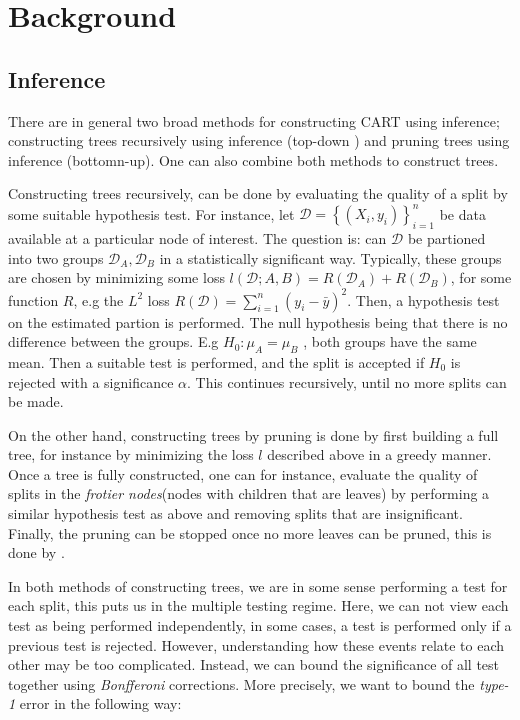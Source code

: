\documentclass{article}
\theoremstyle{definition} \newtheorem{definition}[theorem]{Definition}
\theoremstyle{remark} \newtheorem{remark}[theorem]{Remark}
\begin{document}
\section{Background}

\subsection{Inference}

There are in general two broad methods for constructing CART using
inference; constructing trees recursively using inference (top-down ) and pruning trees
using inference (bottomn-up). One can also combine both methods to construct trees.

Constructing trees recursively, can be done by evaluating the quality of a split
by some suitable hypothesis test. For instance, let $ \mathcal{D} = \left\{
(X_i,y_i) \right\} _{i=1}^{n} $ be data available at a particular node of
interest. The question is: can $ \mathcal{D} $ be partioned into two groups $
\mathcal{D}_A, \mathcal{D}_B $ in a statistically significant way. Typically,
these groups are chosen by minimizing some loss $ l(\mathcal{D}; A, B) =
R(\mathcal{D}_A) + R(\mathcal{D}_B) $, for some function $ R $, e.g the $ L^2 $
loss $ R(\mathcal{D}) = \sum_{i=1}^{n}(y_i - \bar{y})^2$. Then, a hypothesis
test on the estimated partion is performed. The null hypothesis being that there
is no difference between the groups. E.g $ H_0: \mu_A = \mu_B $
\cite{neufeld2022tree}, both groups have the same mean. Then a suitable test is
performed, and the split is accepted if $ H_0 $ is rejected with a significance
$ \alpha $. This continues recursively, until no more splits can be made.

On the other hand, constructing trees by pruning is done by first building a
full tree, for instance by minimizing the loss $ l $ described above in a greedy
manner. Once a tree is fully constructed, one can for instance, evaluate the quality
of splits in the \textit{frotier nodes}(nodes with children that are leaves) by
performing a similar hypothesis test as above and removing splits that are
insignificant. Finally, the pruning can be stopped once no more leaves can be
pruned, this is done by \cite{jensen1997adjusting}.  

In both methods of constructing trees, we are in some sense performing a test
for each split, this puts us in the multiple testing regime. Here, we can not
view each test as being performed independently, in some cases, a test is
performed only if a previous test is rejected. However, understanding how these
events relate to each other may be too complicated. Instead, we can bound the
significance of all test together using \textit{Bonfferoni} corrections. More
precisely, we want to bound the \textit{type-1} error in the following way:
\end{document}
